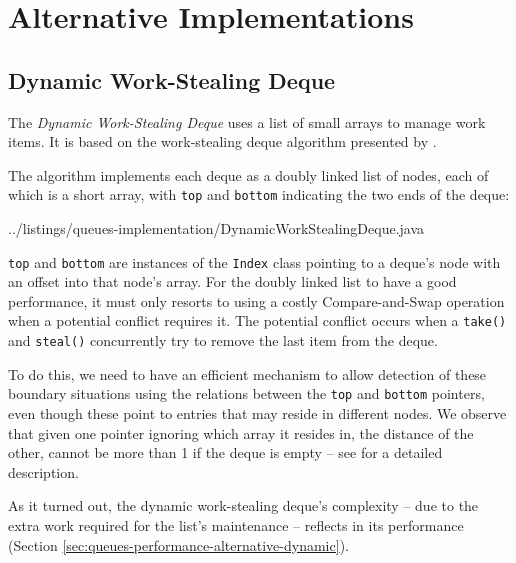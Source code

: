 


\section{Alternative Implementations}
\label{sec:queues-alternative-implementations}

\subsection{Dynamic Work-Stealing Deque}
\label{sec:queues-alternative-implementations-dynamic-deque}

The \emph{Dynamic Work-Stealing Deque} uses a list of small arrays to
manage work items. It is based on the work-stealing deque algorithm
presented by \textcite{Hendler2006}.

The algorithm implements each deque as a doubly linked list of nodes,
each of which is a short array, with \lstinline!top! and
\lstinline!bottom! indicating the two ends of the deque:


{
    ../listings/queues-implementation/DynamicWorkStealingDeque.java
}

\lstinline!top! and \lstinline!bottom! are instances of the
\lstinline!Index! class pointing to a deque's node with an offset into
that node's array. For the doubly linked list to have a good
performance, it must only resorts to using a costly Compare-and-Swap
operation when a potential conflict requires it. The potential
conflict occurs when a \lstinline!take()!  and \lstinline!steal()!
concurrently try to remove the last item from the deque.

To do this, we need to have an efficient mechanism to allow detection
of these boundary situations using the relations between the
\lstinline!top! and \lstinline!bottom! pointers, even though these
point to entries that may reside in different nodes. We observe that
given one pointer ignoring which array it resides in, the distance of
the other, cannot be more than 1 if the deque is empty -- see
\cite{Hendler2006} for a detailed description.

As it turned out, the dynamic work-stealing deque's complexity -- due
to the extra work required for the list's maintenance -- reflects in
its performance (Section
\ref{sec:queues-performance-alternative-dynamic}).

